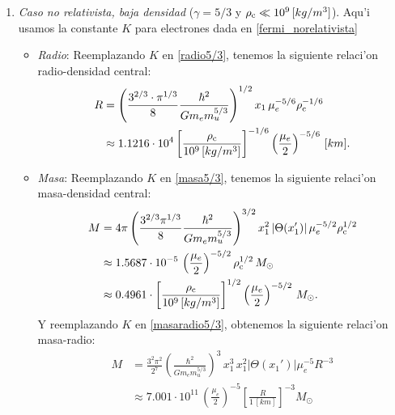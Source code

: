 \begin{enumerate}
 \item \emph{Caso no relativista, baja densidad} ($\gamma=5/3$ y $\rho_{\rm c}\ll10^{9}\,[kg/m^3]$).
Aqu'i usamos la constante $K$ para electrones dada en \eqref{fermi_norelativista}
\begin{itemize}
 \item \emph{Radio}:
Reemplazando $K$ en \eqref{radio5/3}, tenemos la siguiente relaci'on radio-densidad central:
\begin{align}
R&=\left(\frac{3^{2/3}\cdot\pi^{1/3}}{8}\frac{\hbar^2}{Gm_e m_u^{5/3}}\right)^{1/2}x_1\,\mu_e^{-5/6}\rho_{\rm c}^{-1/6}\\
 &\approx1.1216\cdot10^{4}\left[\frac{\rho_{\rm c}}{10^{9}\,[kg/m^3]}\right]^{-1/6}\left(\frac{\mu_e}{2}\right)^{-5/6}\,[km].
\end{align}
\item \emph{Masa}:
Reemplazando $K$ en \eqref{masa5/3}, tenemos la siguiente relaci'on masa-densidad central:
\begin{align}
M&=4\pi\left(\frac{3^{2/3}\pi^{1/3}}{8}\frac{\hbar^2}{Gm_e m_u^{5/3}}\right)^{3/2}x_1^2\left|\Theta(x_1')\right|\mu_e^{-5/2}\rho_{\rm c}^{1/2}\\
&\approx1.5687\cdot 10^{-5}\,\left(\frac{\mu_e}{2}\right)^{-5/2}\rho_{\rm c}^{1/2}\,M_{\odot}\label{enanablanca5/3-masadensidad}\\
&\approx0.4961\cdot\left[\frac{\rho_{\rm c}}{10^{9}\,[kg/m^3]}\right]^{1/2}\left(\frac{\mu_e}{2}\right)^{-5/2}\,M_{\odot}.
\end{align}
Y reemplazando $K$ en \eqref{masaradio5/3}, obtenemos la siguiente relaci'on masa-radio:
\begin{align}
 M&=\frac{3^2\pi^2}{2^7}\left(\frac{\hbar^2}{Gm_em_u^{5/3}}\right)^3\,x_1^3\,x_1^2\left|\Theta(x_1')\right|\mu_e^{-5} R^{-3}\\
&\approx7.001\cdot10^{11}\,\left(\frac{\mu_e}{2}\right)^{-5} \left[\frac{R}{1\,[km]}\right]^{-3}M_{\odot} \label{enanablanca5/3-masaradio}\\

\end{align}
\end{itemize}
\end{enumerate}
